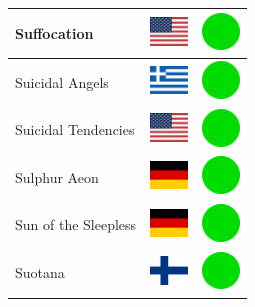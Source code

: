 \documentclass[12pt, a4paper, twoside]{report}
\begin{document}
\begin{center}
\begin{longtable}{|p{5cm}|p{2cm}|p{2cm}|}
 Suffocation                                                & \includegraphics[width=1cm]{../4x3/us} &   \includegraphics[width=1cm]{../likes/y} \\ \hline
 Suicidal Angels                                            & \includegraphics[width=1cm]{../4x3/gr} &   \includegraphics[width=1cm]{../likes/y} \\ \hline
 Suicidal Tendencies                                        & \includegraphics[width=1cm]{../4x3/us} &   \includegraphics[width=1cm]{../likes/y} \\ \hline
 Sulphur Aeon                                               & \includegraphics[width=1cm]{../4x3/de} &   \includegraphics[width=1cm]{../likes/y} \\ \hline
 Sun of the Sleepless                                       & \includegraphics[width=1cm]{../4x3/de} &   \includegraphics[width=1cm]{../likes/y} \\ \hline
 Suotana                                                    & \includegraphics[width=1cm]{../4x3/fi} &   \includegraphics[width=1cm]{../likes/y} \\ \hline

\end{longtable}
\end{center}
\end{document}
